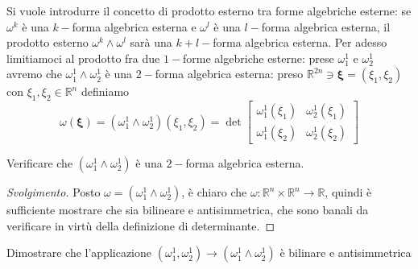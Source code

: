 Si vuole introdurre il concetto di prodotto esterno tra forme algebriche esterne: se $\omega^k$ è una $k-$forma algebrica esterna e $\omega^l$ è una $l-$forma algebrica esterna, il prodotto esterno $\omega^k \wedge \omega^l$ sarà una $k + l-$forma algebrica esterna. Per adesso limitiamoci al prodotto fra due $1-$forme algebriche esterne: prese $\omega^1_1$ e $\omega^1_2$ avremo che $\omega_1^1 \wedge \omega_2^1$ è una $2-$forma algebrica esterna: preso $\mathbb{R}^{2n} \ni \mathbf{\xi} = (\xi_1, \xi_2)$ con $\xi_1, \xi_2 \in \mathbb{R}^n$ definiamo 
$$
\omega(\mathbf{\xi}) = (\omega_1^1 \wedge \omega_2^1)(\xi_1, \xi_2) = \det{\begin{bmatrix}
    \omega_1^1(\xi_1) & \omega_2^1(\xi_1) \\
    \omega_1^1(\xi_2) & \omega_2^1(\xi_2)
\end{bmatrix}}
$$
\begin{exercise}
    Verificare che $(\omega_1^1 \wedge \omega_2^1)$ è una $2-$forma algebrica esterna.
\end{exercise}
\begin{proof}[Svolgimento]
    Posto $\omega = (\omega^1_1 \wedge \omega_2^1)$, è chiaro che $\omega: \mathbb{R}^n \times \mathbb{R}^n \to \mathbb{R}$, quindi è sufficiente mostrare che sia bilineare e antisimmetrica, che sono banali da verificare in virtù della definizione di determinante.
\end{proof}
\begin{exercise}
    Dimostrare che l'applicazione $(\omega_1^1, \omega_2^1) \to (\omega_1^1 \wedge \omega_2^1)$ è bilinare e antisimmetrica
\end{exercise}
